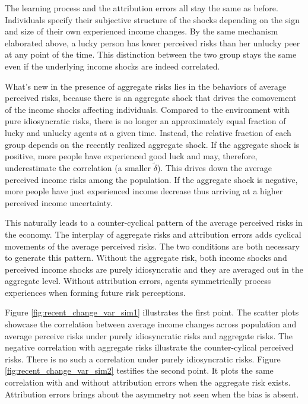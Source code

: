 \documentclass[12pt,notitlepage,onecolumn,aps,pra]{article}
\begin{document}
The learning process and the attribution errors all stay the same as
before. Individuals specify their subjective structure of the shocks
depending on the sign and size of their own experienced income changes.
By the same mechanism elaborated above, a lucky person has lower
perceived risks than her unlucky peer at any point of the time. This
distinction between the two group stays the same even if the underlying
income shocks are indeed correlated.

What's new in the presence of aggregate risks lies in the behaviors of
average perceived risks, because there is an aggregate shock that drives
the comovement of the income shocks affecting individuals. Compared to
the environment with pure idiosyncratic risks, there is no longer an
approximately equal fraction of lucky and unlucky agents at a given
time. Instead, the relative fraction of each group depends on the
recently realized aggregate shock. If the aggregate shock is positive,
more people have experienced good luck and may, therefore, underestimate
the correlation (a smaller \(\tilde \delta\)). This drives down the
average perceived income risks among the population. If the aggregate
shock is negative, more people have just experienced income decrease
thus arriving at a higher perceived income uncertainty.

This naturally leads to a counter-cyclical pattern of the average
perceived risks in the economy. The interplay of aggregate risks and
attribution errors adds cyclical movements of the average perceived
risks. The two conditions are both necessary to generate this pattern.
Without the aggregate risk, both income shocks and perceived income
shocks are purely idiosyncratic and they are averaged out in the
aggregate level. Without attribution errors, agents symmetrically
process experiences when forming future risk perceptions.

Figure \ref{fig:recent_change_var_sim1} illustrates the first point. The
scatter plots showcase the correlation between average income changes
across population and average perceive risks under purely idiosyncratic
risks and aggregate risks. The negative correlation with aggregate risks
illustrate the counter-cylical perceived risks. There is no such a
correlation under purely idiosyncratic risks. Figure
\ref{fig:recent_change_var_sim2} testifies the second point. It plots
the same correlation with and without attribution errors when the
aggregate risk exists. Attribution errors brings about the asymmetry not
seen when the bias is absent.
\end{document}
